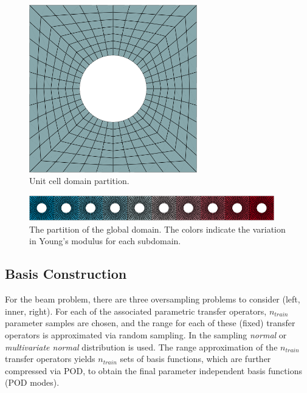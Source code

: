 \documentclass[a4paper]{eccomas_paper-2024}
\begin{document}
\begin{figure}
    \begin{center}
        \includegraphics[width=0.65\textwidth]{../figures/beam/unit_cell.png}
    \end{center}
    \caption{Unit cell domain partition.}\label{fig:unit_cell_domain}
\end{figure}

\begin{figure}
    \begin{center}
        \includegraphics[width=0.95\textwidth]{../figures/beam/global_domain.png}
    \end{center}
    \caption{The partition of the global domain. The colors indicate the variation in Young's modulus for each subdomain.}\label{fig:global_domain}
\end{figure}

\subsection{Basis Construction}
For the beam problem, there are three oversampling problems to consider (left, inner, right).
For each of the associated parametric transfer operators, $n_{train}$ parameter samples are chosen, and
the range for each of these (fixed) transfer operators is approximated via random sampling. In
the sampling \textit{normal} or \textit{multivariate normal} distribution is used.
The range approximation of the $n_{train}$ transfer operators yields $n_{train}$ sets of
basis functions, which are further compressed via POD, to obtain the final parameter
independent basis functions (POD modes).
\end{document}
